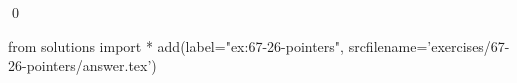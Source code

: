 
\begin{ex}
  \label{ex:67-26-pointers}
  
  \qed
\end{ex}
\begin{python0}
from solutions import *
add(label="ex:67-26-pointers",
    srcfilename='exercises/67-26-pointers/answer.tex')
\end{python0}
